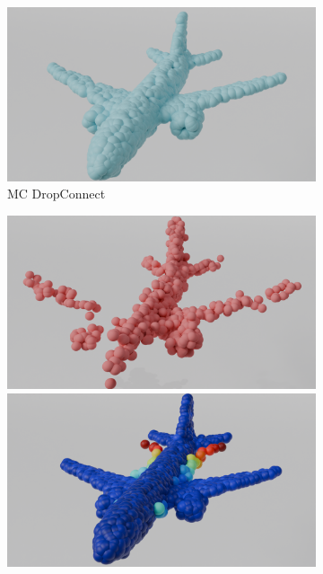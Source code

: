 \begin{figure}[htb]
\begin{subfigure}[t]{\textwidth+20pt\relax}
            \includegraphics[width=\dimexpr\linewidth-20pt\relax]{figures/comp_ap.png}
            \caption{MC DropConnect}
          \end{subfigure}\hfill
          \begin{subfigure}[t]{0.315\textwidth}
            \includegraphics[width=\textwidth]{figures/part_ap.png}
            \includegraphics[width=\textwidth]{figures/5z_ap_mcdo.png}

\end{subfigure}
\end{figure}
